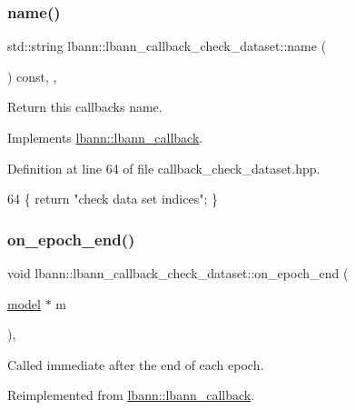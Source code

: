 \subsubsection{\texorpdfstring{name()}{name()}}
{\footnotesize\ttfamily std\+::string lbann\+::lbann\+\_\+callback\+\_\+check\+\_\+dataset\+::name (\begin{DoxyParamCaption}{ }\end{DoxyParamCaption}) const\hspace{0.3cm}{\ttfamily [inline]}, {\ttfamily [override]}, {\ttfamily [virtual]}}

Return this callback\textquotesingle{}s name. 

Implements \hyperlink{classlbann_1_1lbann__callback_a7522c7a14f1d6a1ea762cc2d7248eb3a}{lbann\+::lbann\+\_\+callback}.



Definition at line 64 of file callback\+\_\+check\+\_\+dataset.\+hpp.


\begin{DoxyCode}
64 \{ \textcolor{keywordflow}{return} \textcolor{stringliteral}{"check data set indices"}; \}
\end{DoxyCode}
\mbox{\label{classlbann_1_1lbann__callback__check__dataset_a8cbc105d8bd9d3b493ef34de7c387929}} 
\subsubsection{\texorpdfstring{on\+\_\+epoch\+\_\+end()}{on\_epoch\_end()}}
{\footnotesize\ttfamily void lbann\+::lbann\+\_\+callback\+\_\+check\+\_\+dataset\+::on\+\_\+epoch\+\_\+end (\begin{DoxyParamCaption}\item[{\hyperlink{classlbann_1_1model}{model} $\ast$}]{m }\end{DoxyParamCaption})\hspace{0.3cm}{\ttfamily [override]}, {\ttfamily [virtual]}}

Called immediate after the end of each epoch. 

Reimplemented from \hyperlink{classlbann_1_1lbann__callback_a1fc71110e7f754bf73c9e0f344a448a5}{lbann\+::lbann\+\_\+callback}.



